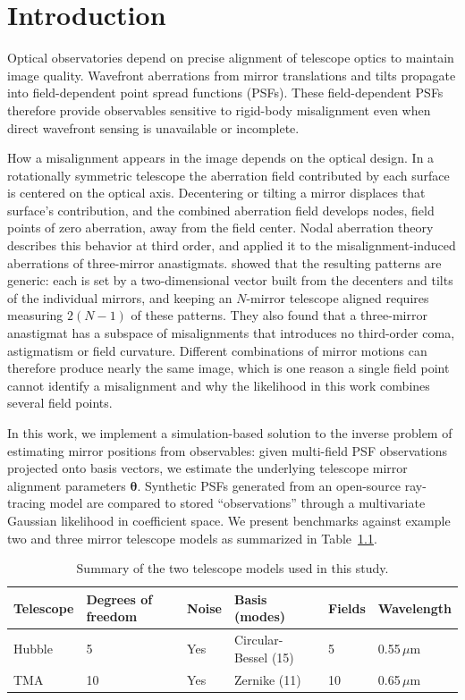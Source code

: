 \chapter{Introduction}\label{sec:intro}
\thispagestyle{fancy} %

Optical observatories depend on precise alignment of telescope optics to maintain image quality. Wavefront aberrations from mirror translations and tilts propagate into field-dependent point spread functions (PSFs). These field-dependent PSFs therefore provide observables sensitive to rigid-body misalignment even when direct wavefront sensing is unavailable or incomplete.

How a misalignment appears in the image depends on the optical design. In a rotationally symmetric telescope the aberration field contributed by each surface is centered on the optical axis. Decentering or tilting a mirror displaces that surface's contribution, and the combined aberration field develops nodes, field points of zero aberration, away from the field center. Nodal aberration theory~\citep{Thompson2005} describes this behavior at third order, and \citet{Thompson2008} applied it to the misalignment-induced aberrations of three-mirror anastigmats. \citet{SchechterLevinson2011} showed that the resulting patterns are generic: each is set by a two-dimensional vector built from the decenters and tilts of the individual mirrors, and keeping an $N$-mirror telescope aligned requires measuring $2(N-1)$ of these patterns. They also found that a three-mirror anastigmat has a subspace of misalignments that introduces no third-order coma, astigmatism or field curvature. Different combinations of mirror motions can therefore produce nearly the same image, which is one reason a single field point cannot identify a misalignment and why the likelihood in this work combines several field points.

In this work, we implement a simulation-based solution to the inverse problem of estimating mirror positions from observables: given multi-field PSF observations projected onto basis vectors, we estimate the underlying telescope mirror alignment parameters $\boldsymbol{\theta}$. Synthetic PSFs generated from an open-source ray-tracing model are compared to stored ``observations'' through a multivariate Gaussian likelihood in coefficient space. We present benchmarks against example two and three mirror telescope models as summarized in Table~\ref{tab:summary}.

\begin{table}
\centering
\caption{Summary of the two telescope models used in this study.}
\label{tab:summary}
\begin{tabular}{llllll}
\hline
Telescope & Degrees of freedom & Noise & Basis (modes) & Fields & Wavelength \\
\hline
Hubble & 5  & Yes & Circular-Bessel (15) & 5  & 0.55\,$\mu$m \\
TMA    & 10 & Yes & Zernike (11) & 10 & 0.65\,$\mu$m \\
\hline
\end{tabular}
\end{table}

